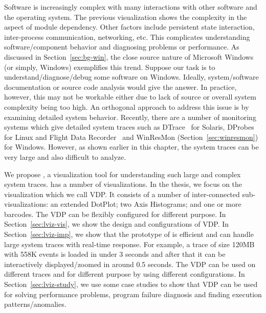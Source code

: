 
Software is increasingly complex with many interactions with other software
and the operating system.
The previous visualization shows the complexity in the
aspect of module dependency.
Other factors include persistent state interaction, inter-process communication,
networking, etc.
This complicates understanding software/component behavior and diagnosing
problems or performance.
As discussed in Section~\ref{sec:bg-win},
the close source nature of Microsoft Windows (or simply, Windows)
exemplifies this trend.
Suppose our task is to understand/diagnose/debug some software on Windows.
Ideally, system/software documentation or source code
analysis would give the answer.
In practice, however, this may not be
workable either due to lack of source or overall
system complexity being too high.
An orthogonal approach to address this issue is by examining
detailed system behavior.
Recently, there are a number of monitoring systems which give detailed system
traces such as DTrace~\cite{cantrill2004dynamic} for Solaris,
DProbes~\cite{moore2001dprobes,bhattacharya2003dynamic} for Linux and Flight
Data Recorder~\cite{verbowski6flight} and WinResMon (Section~\ref{sec:winresmon})
for Windows.
However, as shown earlier in this chapter,
the system traces can be very large and also
difficult to analyze.

We propose , a visualization tool for
understanding such large and complex system traces.
 has a number of visualizations.
In the thesis, we focus on the visualization which we call VDP.
It consists of a number of inter-connected sub-visualizations:
an extended DotPlot;
two Axis Histograms; and one or more barcodes.
The VDP can be flexibly configured for different purpose.
In Section~\ref{sec:lviz-vis}, we show the design and configurations of VDP.
In Section~\ref{sec:lviz-imp}, we show that
the prototype of  is efficient and can handle large system traces
with real-time response. For example, a trace of size 120MB with 558K events 
is loaded in under 3 seconds
and after that it can be interactively displayed/zoomed in around 0.5 seconds.
The VDP can be used on different traces and for different purpose
by using different configurations.
In Section~\ref{sec:lviz-study}, we use some case studies to show that
VDP can be used for solving performance problems,
program failure diagnosis and finding execution patterns/anomalies.
